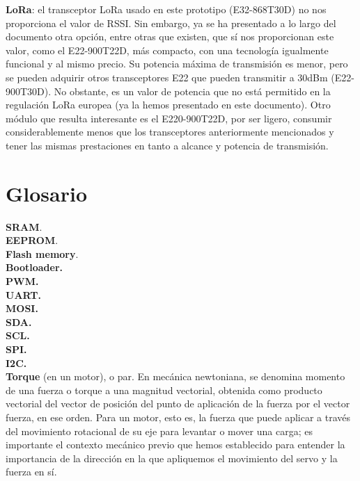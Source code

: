 \documentclass[12pt]{article}
\begin{document}
	\noindent \textbf{LoRa}: el transceptor LoRa usado en este prototipo (E32-868T30D) no nos proporciona el valor de RSSI. Sin embargo, ya se ha presentado a lo largo del documento otra opción, entre otras que existen, que sí nos proporcionan este valor, como el E22-900T22D, más compacto, con una tecnología igualmente funcional y al mismo precio. Su potencia máxima de transmisión es menor, pero se pueden adquirir otros transceptores E22 que pueden transmitir a 30dBm (E22-900T30D). No obstante, es un valor de potencia que no está permitido en la regulación LoRa europea (ya la hemos presentado en este documento). Otro módulo que resulta interesante es el E220-900T22D, por ser ligero, consumir considerablemente menos que los transceptores anteriormente mencionados y tener las mismas prestaciones en tanto a alcance y potencia de transmisión.\\
	
	\pagebreak
	
	\section*{Glosario}
	
	\noindent \textbf{\large SRAM}. \\
	
	\noindent \textbf{\large EEPROM}. \\
	
	\noindent \textbf{\large Flash memory}. \\
	
	\noindent \textbf{\large Bootloader.} \\
	
	\noindent \textbf{\large PWM.} \\
	
	\noindent \textbf{\large UART.} \\
	
	\noindent \textbf{\large MOSI.} \\
	
	\noindent \textbf{\large SDA.} \\
	
	\noindent \textbf{\large SCL.} \\
	
	\noindent \textbf{\large SPI.} \\
	
	\noindent \textbf{\large I2C.} \\
	
	\noindent \textbf{\large Torque} (en un motor), o par. En mecánica newtoniana, se denomina momento de una fuerza o torque a una magnitud vectorial, obtenida como producto vectorial del vector de posición del punto de aplicación de la fuerza por el vector fuerza, en ese orden. Para un motor, esto es, la fuerza que puede aplicar a través del movimiento rotacional de su eje para levantar o mover una carga; es importante el contexto mecánico previo que hemos establecido para entender la importancia de la dirección en la que apliquemos el movimiento del servo y la fuerza en sí.\\
	
\end{document}
